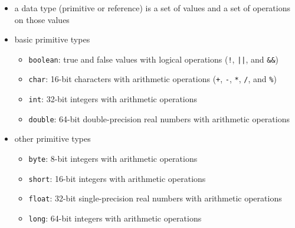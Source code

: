 \documentclass[8pt,a4paper,compress]{beamer}
\begin{document}
\begin{frame}[fragile]
\begin{itemize}
\item a data type (primitive or reference) is a set of values and a set of operations on those values

\item basic primitive types
\begin{itemize}
\item \lstinline{boolean}: true and false values with logical operations (\lstinline{!}, \lstinline{||}, and \lstinline{&&})
\item \lstinline{char}: 16-bit characters with arithmetic operations (\lstinline{+}, \lstinline{-}, \lstinline{*}, \lstinline{/}, and \lstinline{%})
\item \lstinline{int}: 32-bit integers with arithmetic operations
\item \lstinline{double}: 64-bit double-precision real numbers with arithmetic operations
\end{itemize}

\item other primitive types
\begin{itemize}
\item \lstinline{byte}: 8-bit integers with arithmetic operations
\item \lstinline{short}: 16-bit integers with arithmetic operations
\item \lstinline{float}: 32-bit single-precision real numbers with arithmetic operations
\item \lstinline{long}: 64-bit integers with arithmetic operations
\end{itemize}
\end{itemize}
\end{frame}
\end{document}
